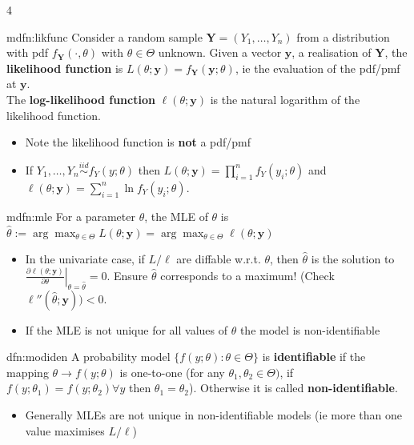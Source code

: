 \documentclass[landscape, 8pt]{extarticle}
\begin{document}
\begin{multicols*}{4}
		\begin{mdfn}{mdfn:likfunc}{ }
			Consider a random sample $\bm{Y} = (Y_1, \dots, Y_n)$ from a distribution with pdf $f_{\bm{Y}} (\cdot , \theta)$ with $\theta\in \Theta$ unknown. Given a vector $\bm{y}$, a realisation of $\bm{Y}$, the \textbf{likelihood function} is $L(\theta; \bm{y}) = f_{\bm{Y}}(\bm{y}; \theta)$, ie the evaluation of the pdf/pmf at $\bm{y}$.\\
			The \textbf{log-likelihood function} $\ell (\theta; \bm{y})$ is the natural logarithm of the likelihood function.
			\begin{itemize}
				\item Note the likelihood function is \textbf{not} a pdf/pmf
				\item If $Y_1, \dots, Y_n \overset{iid}{\sim} f_Y(y; \theta)$ then $L(\theta; \bm{y}) = \prod_{i=1}^{n} f_Y(y_i; \theta)$ and $\ell(\theta; \bm{y}) = \sum^{n}_{i=1}\ln f_Y(y_i; \theta)$.
			\end{itemize}
			
		\end{mdfn}
		
		
		\begin{mdfn}{mdfn:mle}{ }
			For a parameter $\theta$, the MLE of $\theta$ is $\hat \theta := \arg \max_{\theta\in \Theta} L(\theta; \bm{y}) = \arg \max_{\theta\in \Theta} \ell(\theta; \bm{y})$
			\begin{itemize}
				\item In the univariate case, if $L/\ell$ are diffable w.r.t. $\theta$, then $\hat\theta$ is the solution to $ \left. \frac{\partial \ell(\theta; \bm{y})}{\partial \theta} \right|_{\theta = \hat \theta} = 0$. Ensure $\hat \theta$ corresponds to a maximum! (Check $\ell''(\hat \theta; \bm{y})) < 0$.
				\item If the MLE is not unique for all values of $\theta$ the model is non-identifiable
			\end{itemize}
			
		\end{mdfn}
		
		
		\begin{dfn}{dfn:modiden}{ }
			A probability model $\{f(y; \theta) : \theta\in \Theta\}$ is \textbf{identifiable} if the mapping $\theta \to f(y; \theta)$ is one-to-one (for any $\theta_1, \theta_2\in \Theta)$, if $f(y; \theta_1) = f(y; \theta_2)\forall y$ then $\theta_1 = \theta_2$). Otherwise it is called \textbf{non-identifiable}.
			\begin{itemize}
				\item Generally MLEs are not unique in non-identifiable models (ie more than one value maximises $L/\ell$)
			\end{itemize}
			

\end{dfn}
\end{multicols*}
\end{document}
